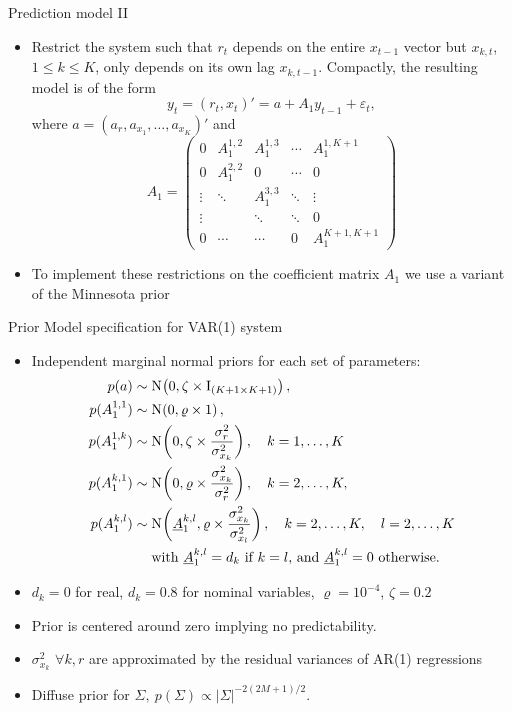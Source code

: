 \documentclass[9pt,xcolor=x11names,compress]{beamer}
\let\natbibcitep\citep
\renewcommand\citep{\bibpunct{(}{)}{;}{a}{,}{;}\natbibcitep}
\theoremstyle{standard}
\theoremstyle{notes}
\newcommand{\No}[1]{\text{N}\hspace{-0.05cm}\left(#1\right)}
\begin{document}
\begin{frame}{Prediction model II}
	\begin{itemize}
		\item Restrict the system such that $r_t$ depends on the entire $x_{t-1}$ vector but $x_{k,t}$, $1\leq k\leq K$, only depends on its own lag $x_{k,t-1}$. Compactly, the resulting model is of the form
		\begin{equation}\label{eqn:var1}
		y_t=(r_t,x_t)'=a+A_1y_{t-1}+\varepsilon_t,
		\end{equation}
		where $a=(a_r,a_{x_1},\ldots,a_{x_K})'$ and $$A_1=\begin{pmatrix} 0 & A_1^{1,2}& A_1^{1,3}&\cdots  & A_1^{1,K+1}\\0 & A_1^{2,2} &0& \cdots & 0\\ \vdots&\ddots&A_1^{3,3}&\ddots& \vdots\\\vdots&&\ddots&\ddots&0\\0&\cdots&\cdots&0&A_1^{K+1,K+1}\end{pmatrix}$$
		\item To implement these restrictions on the coefficient matrix $A_1$ we use a variant of the Minnesota prior \citep{doan1984}
	\end{itemize}
\end{frame}

\begin{frame}{Prior Model specification for VAR(1) system}
	\begin{itemize}
		\item Independent marginal normal priors for each set of parameters:
		\begin{align}\label{eqn:priora}
		p(a)&\sim\No{0,\zeta\times\text{I}_{(K+1\times K+1)}},\\\label{eqn:priorA11}
		p(A_1^{1,1}) &\sim \No{0,\varrho\times1},\\\label{eqn:priorA1k}
		p(A_1^{1,k}) &\sim \No{0,\zeta\times \frac{\sigma_r^2}{\sigma_{x_k}^2}},\quad k=1,\ldots,K\\\label{eqn:priorAk1}
		p(A_1^{k,1}) &\sim \No{0,\varrho\times \frac{\sigma_{x_k}^2}{\sigma_{r}^2}},\quad k=2,\ldots,K,\\\label{eqn:priorAkl}
		p(A_1^{k,l}) &\sim \No{\underline{A}_1^{k,l},\varrho\times \frac{\sigma_{x_k}^2}{\sigma_{x_l}^2}},\quad k=2,\ldots,K,\quad l=2,\ldots,K\\
		&  \quad\,\,\text{with } \underline{A}_1^{k,l} = d_k \text{ if $k=l$, and $\underline{A}_1^{k,l} = 0$ otherwise.} \nonumber
		\end{align}
		\item $d_k=0$ for real, $d_k=0.8$ for nominal variables, $\varrho=10^{-4}$, $\zeta=0.2$
		\item Prior is centered around zero implying no predictability. 
		\item $\sigma_{x_k}^2$ $\forall k,r$ are approximated by the residual variances of AR(1) regressions
		\item Diffuse prior for $\Sigma, \ p(\Sigma) \propto | \Sigma|^{-2(2M+1)/2}$.
	\end{itemize}
\end{frame}
\end{document}
